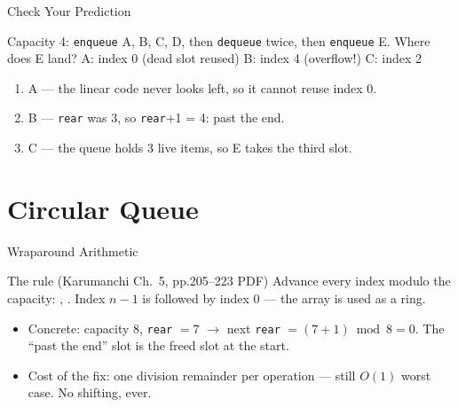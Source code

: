 \documentclass[aspectratio=169]{beamer}
\begin{document}
\begin{frame}{Check Your Prediction}
  \begin{block}{Capacity 4: \texttt{enqueue} A, B, C, D, then \texttt{dequeue}
    twice, then \texttt{enqueue} E. Where does E land?}
    A: index 0 (dead slot reused) \quad B: index 4 (overflow!) \quad
    C: index 2
  \end{block}
  \begin{enumerate}
    \item A --- the linear code never looks left, so it cannot reuse index 0.
    \item B --- \texttt{rear} was 3, so \texttt{rear}+1 = 4: past the end.
    \item C --- the queue holds 3 live items, so E takes the third slot.
  \end{enumerate}
\end{frame}


\section{Circular Queue}


\begin{frame}{Wraparound Arithmetic}
  \begin{block}{The rule (Karumanchi Ch.~5, pp.205--223 PDF)
    \cite{Karumanchi2017_data_structures_algorithms_made_easy}}
    Advance every index modulo the capacity: , . Index $n - 1$ is followed by index $0$
    --- the array is used as a ring.
  \end{block}
  \begin{itemize}
    \item Concrete: capacity $8$, \texttt{rear} $= 7$ $\to$ next
      \texttt{rear} $= (7 + 1) \bmod 8 = 0$. The ``past the end'' slot is the
      freed slot at the start.
    \item Cost of the fix: one division remainder per operation --- still
      $O(1)$ worst case. No shifting, ever.
  \end{itemize}
\end{frame}
\end{document}
